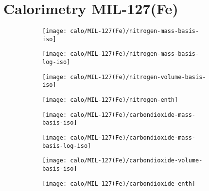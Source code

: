 
\section{Calorimetry MIL-127(Fe)}

\begin{figure}[H]
    \centering

    \begin{subfigure}{0.25\linewidth}
        \texttt{[image: calo/MIL-127(Fe)/nitrogen-mass-basis-iso]}%
        \label{appx:fig:shaping:mil127n2mass}
    \end{subfigure}%
    \begin{subfigure}{0.25\linewidth}
        \texttt{[image: calo/MIL-127(Fe)/nitrogen-mass-basis-log-iso]}%
        \label{appx:fig:shaping:mil127n2masslog}
    \end{subfigure}%
    \begin{subfigure}{0.25\linewidth}
        \texttt{[image: calo/MIL-127(Fe)/nitrogen-volume-basis-iso]}%
        \label{appx:fig:shaping:mil127n2volume}
    \end{subfigure}%
    \begin{subfigure}{0.25\linewidth}
        \texttt{[image: calo/MIL-127(Fe)/nitrogen-enth]}%
        \label{appx:fig:shaping:mil127n2enth}
    \end{subfigure}%
    
    \begin{subfigure}{0.25\textwidth}
        \texttt{[image: calo/MIL-127(Fe)/carbondioxide-mass-basis-iso]}%
        \label{appx:fig:shaping:mil127co2mass}
    \end{subfigure}%
    \begin{subfigure}{0.25\textwidth}
        \texttt{[image: calo/MIL-127(Fe)/carbondioxide-mass-basis-log-iso]}%
        \label{appx:fig:shaping:mil127co2masslog}
    \end{subfigure}%
    \begin{subfigure}{0.25\textwidth}
        \texttt{[image: calo/MIL-127(Fe)/carbondioxide-volume-basis-iso]}%
        \label{appx:fig:shaping:mil127co2volume}
    \end{subfigure}%
    \begin{subfigure}{0.25\textwidth}
        \texttt{[image: calo/MIL-127(Fe)/carbondioxide-enth]}%
        \label{appx:fig:shaping:mil127co2enth}
    \end{subfigure}%


\end{figure}
